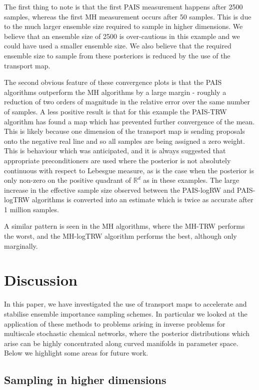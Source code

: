 \documentclass[final]{siamltex}
\begin{document}
The first thing to note is that the first PAIS measurement happens
after 2500 samples, whereas the first MH measurement occurs after 50
samples. This is due to the much larger ensemble size required to
sample in higher dimensions. We believe that an ensemble size of 2500
is over-cautious in this example and we could have used a smaller
ensemble size. We also believe that the required ensemble size to sample
from these posteriors is reduced by the use of the transport map.

The second obvious feature of these convergence plots is that the PAIS
algorithms outperform the MH algorithms by a large margin - roughly a
reduction of two orders of magnitude in the relative error over the
same number of samples. A less positive result is that for this
example the PAIS-TRW algorithm has found a map which has prevented
further convergence of the mean. This is likely because one dimension
of the transport map is sending proposals onto the negative real line
and so all samples are being assigned a zero weight. This is behaviour
which was anticipated, and it is always suggested that appropriate
preconditioners are used where the posterior is not absolutely
continuous with respect to Lebesgue measure, as is the case when the
posterior is only non-zero on the positive quadrant of $\mathbb{R}^d$
as in these examples. The large increase in the effective sample size
observed between the PAIS-logRW and PAIS-logTRW algorithms is
converted into an estimate which is twice as accurate after 1 million
samples. 

A similar pattern is seen in the MH algorithms, where the MH-TRW
performs the worst, and the MH-logTRW algorithm performs the best,
although only marginally. 

\section{Discussion}\label{sec:conc}
In this paper, we have investigated the use of transport maps to
accelerate and stabilise ensemble importance sampling schemes. In
particular we looked at the application of these methods to problems
arising in inverse problems for multiscale stochastic chemical
networks, where the posterior distributions which arise can be highly
concentrated along curved manifolds in parameter space.
Below we highlight some areas for future work.

\subsection{Sampling in higher
  dimensions}\label{sec:TPAIS_higher_dim}
\end{document}
